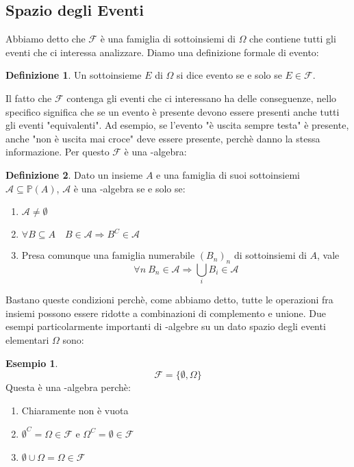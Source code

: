 \documentclass{article}
\theoremstyle{plain}
\theoremstyle{definition}
\newtheorem{definizione}{Definizione}[section]
\newtheorem{esempio}{Esempio}[section]
\theoremstyle{remark}
\begin{document}
\subsection{Spazio degli Eventi} %
\label{sub:spazio_degli_eventi}
Abbiamo detto che $\mathscr{F}$ è una famiglia di sottoinsiemi di $\Omega$ che contiene tutti gli eventi che ci interessa analizzare. Diamo una definizione formale di evento:
\begin{definizione}
	Un sottoinsieme $E$ di $\Omega$ si dice evento se e solo se $E\in\mathscr{F}$.
\end{definizione}
Il fatto che $\mathscr{F}$ contenga gli eventi che ci interessano ha delle conseguenze, nello specifico significa che se un evento è presente devono essere presenti anche tutti gli eventi "equivalenti". Ad esempio, se l'evento "è uscita sempre testa" è presente, anche "non è uscita mai croce" deve essere presente, perchè danno la stessa informazione. Per questo $\mathscr{F}$ è una \sigma-algebra:
\begin{definizione}
	Dato un insieme $A$ e una famiglia di suoi sottoinsiemi $\mathscr{A}\subseteq\mathds{P}(A)$, $\mathscr{A}$ è una \sigma-algebra se e solo se:
	\begin{enumerate}
		\item $\mathscr{A}\neq\emptyset$
		\item $\forall B\subseteq A\quad B\in\mathscr{A}\Rightarrow B^C\in\mathscr{A}$
		\item Presa comunque una famiglia numerabile $(B_n)_n$ di sottoinsiemi di $A$, vale
		\begin{equation*}
			\forall n\ B_n\in\mathscr{A}\Rightarrow\bigcup_i B_i\in\mathscr{A}
		\end{equation*}
	\end{enumerate}
\end{definizione}
Bastano queste condizioni perchè, come abbiamo detto, tutte le operazioni fra insiemi possono essere ridotte a combinazioni di complemento e unione. Due esempi particolarmente importanti di \sigma-algebre su un dato spazio degli eventi elementari $\Omega$ sono:
\begin{esempio}
	\begin{equation*}
		\mathscr{F}=\{\emptyset, \Omega\}
	\end{equation*}
	Questa è una \sigma-algebra perchè:
	\begin{enumerate}
		\item Chiaramente non è vuota
		\item $\emptyset^C=\Omega\in\mathscr{F}$ e $\Omega^C=\emptyset\in\mathscr{F}$
		\item $\emptyset\cup\Omega=\Omega\in\mathscr{F}$
	\end{enumerate}
\end{esempio}
\end{document}
